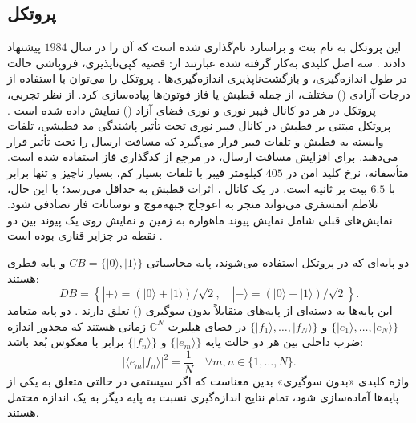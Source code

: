 \subsection{پروتکل }
\label{subsec:7-3-1}
این پروتکل به نام بنت و براسارد نام‌گذاری شده است که آن را در سال $1984$ پیشنهاد دادند \cite{7-13, 7-14}. سه اصل کلیدی به‌کار گرفته شده عبارتند از: قضیه کپی‌ناپذیری، فروپاشی حالت در طول اندازه‌گیری، و بازگشت‌ناپذیری اندازه‌گیری‌ها \cite{7-6}. پروتکل  را می‌توان با استفاده از درجات آزادی () مختلف، از جمله  قطبش \cite{7-23} یا فاز فوتون‌ها \cite{7-20} پیاده‌سازی کرد. از نظر تجربی، پروتکل  در هر دو کانال فیبر نوری و نوری فضای آزاد () نمایش داده شده است \cite{7-23, 7-24}. پروتکل  مبتنی بر قطبش در کانال فیبر نوری تحت تأثیر پاشندگی مد قطبشی، تلفات وابسته به قطبش و تلفات فیبر قرار می‌گیرد که مسافت ارسال را تحت تأثیر قرار می‌دهند. برای افزایش مسافت ارسال، در مرجع \cite{7-24} از کدگذاری فاز استفاده شده است. متأسفانه، نرخ کلید امن در $405$ کیلومتر فیبر با تلفات بسیار کم، بسیار ناچیز و تنها برابر با $6.5$ بیت بر ثانیه است. در یک کانال ، اثرات قطبش به حداقل می‌رسد؛ با این حال، تلاطم اتمسفری می‌تواند منجر به اعوجاج جبهه‌موج و نوسانات فاز تصادفی شود. نمایش‌های قبلی  شامل نمایش پیوند  ماهواره به زمین و نمایش روی یک پیوند  بین دو نقطه در جزایر قناری بوده است \cite{7-23, 7-24}.

دو پایه‌ای که در پروتکل  استفاده می‌شوند، پایه محاسباتی $CB = \{ |0\rangle, |1\rangle \}$ و پایه قطری هستند:
\begin{equation}
	DB = \left\{ |+\rangle = (|0\rangle + |1\rangle)/\sqrt{2}, \quad |-\rangle = (|0\rangle - |1\rangle)/\sqrt{2} \right\}.
	\label{eq:7-7}
\end{equation}
این پایه‌ها به دسته‌ای از پایه‌های متقابلاً بدون سوگیری () تعلق دارند \cite{7-25, 7-26, 7-27, 7-28, 7-29}. دو پایه متعامد $\{|e_1\rangle, \dots, |e_N\rangle\}$ و $\{|f_1\rangle, \dots, |f_N\rangle\}$ در فضای هیلبرت $\mathbb{C}^N$ زمانی  هستند که مجذور اندازه ضرب داخلی بین هر دو حالت پایه $\{|e_m\rangle\}$ و $\{|f_n\rangle\}$ برابر با معکوس بُعد باشد:
\begin{equation}
	|\langle e_m | f_n \rangle|^2 = \frac{1}{N} \quad \forall m, n \in \{1, \dots, N\}.
	\label{eq:7-8}
\end{equation}
واژه کلیدی «بدون سوگیری» بدین معناست که اگر سیستمی در حالتی متعلق به یکی از پایه‌ها آماده‌سازی شود، تمام نتایج اندازه‌گیری نسبت به پایه دیگر به یک اندازه محتمل هستند.

